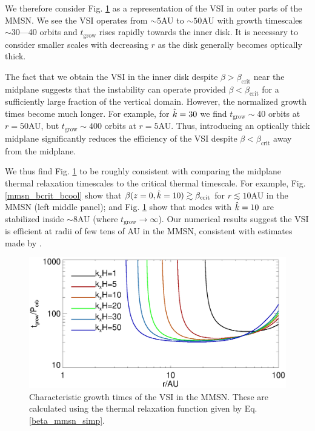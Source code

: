 
We therefore consider Fig. \ref{mmsn_overall} as a representation of the
VSI in outer parts of the MMSN. We see the VSI operates from $\sim 5$AU to $\sim
50$AU with growth timescales $\sim 30$---40 orbits and
$t_\mathrm{grow}$ rises rapidly towards the inner disk. It is
necessary to consider smaller scales with decreasing $r$ as the disk
generally becomes optically thick.  

The fact that we obtain the VSI in the inner disk despite $\beta >
\beta_\mathrm{crit}$ near the midplane suggests that the instability
can operate provided $\beta < \beta_\mathrm{crit}$ for a sufficiently large
fraction of the vertical domain. However, the normalized growth times
become much longer. For example, for $\hat{k}=30$ we find
$t_\mathrm{grow}\sim 40$ orbits at $r=50$AU, but $t_\mathrm{grow}\sim
400$ orbits at $r=5$AU. Thus, introducing an optically thick midplane
significantly reduces the efficiency of the VSI despite $\beta <
\beta_\mathrm{crit}$ away from the midplane. 


We thus find Fig. \ref{mmsn_overall} to be roughly consistent with
comparing the midplane thermal relaxation timescales to the critical
thermal timescale. For example, 
Fig. \ref{mmsn_bcrit_bcool} show that $\beta(z=0,\hat{k}=10) \gtrsim
\beta_\mathrm{crit}$ for $r\lesssim 10$AU in the MMSN (left middle
panel); and Fig. \ref{mmsn_overall} 
show that modes with $\hat{k}=10$ are stabilized inside $\sim 8$AU (where
$t_\mathrm{grow}\to\infty$). Our numerical results suggest the VSI
is efficient at radii of few tens of AU in the MMSN, consistent with
estimates made by . 

\begin{figure}
  \includegraphics[width=\linewidth]{figures/eigen_compare_grow.ps}
  \caption{Characteristic growth times of the VSI in 
    the MMSN. These are calculated using the thermal relaxation
    function given by Eq. \ref{beta_mmsn_simp}. 
    \label{mmsn_overall}}    
\end{figure}
